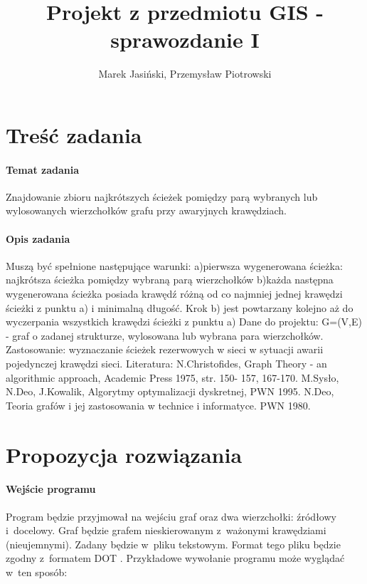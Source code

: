 \documentclass[a4paper, 12pt]{article}
\title {Projekt z przedmiotu GIS - sprawozdanie I}
\author{Marek Jasiński, Przemysław Piotrowski}
\begin{document}
\maketitle

\section{Treść zadania}

\paragraph{Temat zadania}
Znajdowanie zbioru najkrótszych ścieżek pomiędzy parą wybranych lub wylosowanych wierzchołków grafu przy awaryjnych krawędziach.

\paragraph{Opis zadania}
Muszą być spełnione następujące warunki: a)pierwsza wygenerowana ścieżka: najkrótsza ścieżka pomiędzy wybraną parą wierzchołków b)każda następna wygenerowana ścieżka posiada krawędź różną od co najmniej jednej krawędzi ścieżki z punktu a) i minimalną długość. Krok b) jest powtarzany kolejno aż do wyczerpania wszystkich krawędzi ścieżki z punktu a) Dane do projektu: G=(V,E) - graf o zadanej strukturze, wylosowana lub wybrana para wierzchołków. Zastosowanie: wyznaczanie ścieżek rezerwowych w sieci w sytuacji awarii pojedynczej krawędzi sieci. Literatura: N.Christofides, Graph Theory - an algorithmic approach, Academic Press 1975, str. 150- 157, 167-170. M.Sysło, N.Deo, J.Kowalik, Algorytmy optymalizacji dyskretnej, PWN 1995. N.Deo, Teoria grafów i jej zastosowania w technice i informatyce. PWN 1980.

\section{Propozycja rozwiązania}

\paragraph{Wejście programu}
Program będzie przyjmował na wejściu graf oraz dwa wierzchołki: źródłowy i~docelowy. Graf będzie grafem nieskierowanym z~ważonymi krawędziami (nieujemnymi). Zadany będzie w~pliku tekstowym. Format tego pliku będzie zgodny z~formatem DOT \cite{dot}. Przykładowe wywołanie programu może wyglądać w~ten sposób:
\end{document}
